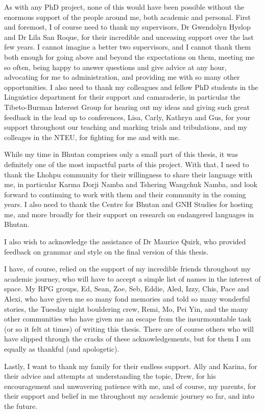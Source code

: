 As with any PhD project, none of this would have been possible without the enormous support of the people around me, both academic and personal. First and foremost, I of course need to thank my supervisors, Dr Gwendolyn Hyslop and Dr Lila San Roque, for their incredible and unceasing support over the last few years. I cannot imagine a better two supervisors, and I cannot thank them both enough for going above and beyond the expectations on them, meeting me so often, being happy to answer questions and give advice at any hour, advocating for me to administration, and providing me with so many other opportunities. I also need to thank my colleagues and fellow PhD students in the Linguistics department for their support and camaraderie, in particular the Tibeto-Burman Interest Group for hearing out my ideas and giving such great feedback in the lead up to conferences, Lisa, Carly, Kathryn and Gus, for your support throughout our teaching and marking trials and tribulations, and my colleages in the NTEU, for fighting for me and with me.

While my time in Bhutan comprises only a small part of this thesis, it was definitely one of the most impactful parts of this project. With that, I need to thank the Lhohpu community for their willingness to share their language with me, in particular Karma Dorji Namba and Tshering Wangchuk Namba, and look forward to continuing to work with them and their community in the coming years. I also need to thank the Centre for Bhutan and GNH Studies for hosting me, and more broadly for their support on research on endangered languages in Bhutan.

I also wish to acknowledge the assistance of Dr Maurice Quirk, who provided feedback on grammar and style on the final version of this thesis.

I have, of course, relied on the support of my incredible friends throughout my academic journey, who will have to accept a simple list of names in the interest of space. My RPG groups, Ed, Sean, Zoe, Seb, Eddie, Aled, Izzy, Chis, Pace and Alexi, who have given me so many fond memories and told so many wonderful stories, the Tuesday night bouldering crew, Remi, Mo, Pei Yin, and the many other communities who have given me an escape from the insurmountable task (or so it felt at times) of writing this thesis.
There are of course others who will have slipped through the cracks of these acknowledgements, but for them I am equally as thankful (and apologetic).

Lastly, I want to thank my family for their endless support. Ally and Karina, for their advice and attempts at understanding the topic, Drew, for his encouragement and unwavering patience with me, and of course, my parents, for their support and belief in me throughout my academic journey so far, and into the future.